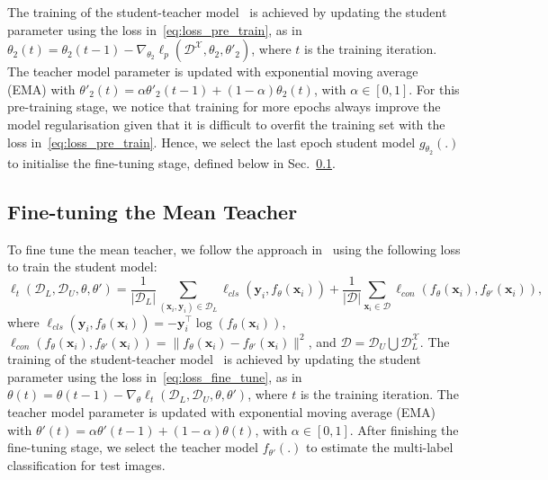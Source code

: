 \documentclass[runningheads]{llncs}
\begin{document}
The training of the student-teacher model~\cite{moco,zhou2020comparing,tarvainen2017mean} is achieved by updating the student parameter using the loss in~\eqref{eq:loss_pre_train}, as in
$\theta_2(t) = \theta_2(t-1) - \nabla_{\theta_2}\ell_{p}(\mathcal{D}^{\mathcal{X}},\theta_2,\theta'_2)$, where $t$ is the training iteration.  The teacher model parameter is updated with exponential moving average (EMA) with $\theta'_2(t) = \alpha \theta'_2(t-1) + (1-\alpha)\theta_2(t) $, with $\alpha\in[0,1]$.
For this pre-training stage, we notice that training for more epochs always improve the model regularisation given that it is difficult to overfit the training set with the loss in~\eqref{eq:loss_pre_train}. 
Hence, we select the last epoch student model $g_{\theta_2}(.)$ to initialise the fine-tuning stage, defined below in Sec.~\ref{sec:fine_tune}. 


\subsection{Fine-tuning the Mean Teacher}
\label{sec:fine_tune}

To fine tune the mean teacher, we follow the approach in~\cite{moco,tarvainen2017mean} using the following loss to train the student model:
\begin{equation}
\ell_{t}(\mathcal{D}_L,\mathcal{D}_U,\theta,\theta') = \frac{1}{|\mathcal{D}_L|}\sum_{(\mathbf{x}_i,\mathbf{y}_i) \in \mathcal{D}_L} \ell_{cls}(\mathbf{y}_i,f_{\theta}(\mathbf{x}_i))  + \frac{1}{|\mathcal{D}|}\sum_{\mathbf{x}_i \in \mathcal{D}} \ell_{con}(f_{\theta}(\mathbf{x}_i),f_{\theta'}(\mathbf{x}_i) ),
    \label{eq:loss_fine_tune}
\end{equation}
where $\ell_{cls}(\mathbf{y}_i,f_{\theta}(\mathbf{x}_i))=-\mathbf{y}_i^{\top}\log(f_{\theta}(\mathbf{x}_i))$,
$\ell_{con}(f_{\theta}(\mathbf{x}_i),f_{\theta'}(\mathbf{x}_i) ) = \| f_{\theta}(\mathbf{x}_i) - f_{\theta'}(\mathbf{x}_i) \|^2$, and 
$\mathcal{D}=\mathcal{D}_U \bigcup \mathcal{D}^{\mathcal{X}}_L$.
The training of the student-teacher model~\cite{moco,tarvainen2017mean,zhou2020comparing} is achieved by updating the student parameter using the loss in~\eqref{eq:loss_fine_tune}, as in
$\theta(t) = \theta(t-1) - \nabla_{\theta}\ell_{t}(\mathcal{D}_L,\mathcal{D}_U,\theta,\theta')$, where $t$ is the training iteration.  The teacher model parameter is updated with exponential moving average (EMA) with $\theta'(t) = \alpha \theta'(t-1) + (1-\alpha)\theta(t) $, with $\alpha\in[0,1]$.
After finishing the fine-tuning stage, we select the teacher model $f_{\theta'}(.)$ to estimate the multi-label classification for test images.
\end{document}
